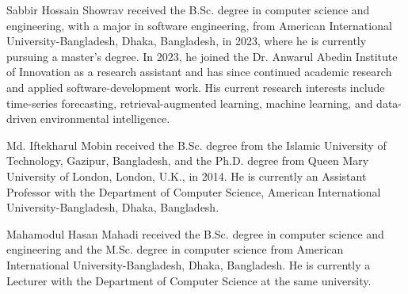 \documentclass{ieeeaccess}
\begin{document}



\begin{IEEEbiographynophoto}{Sabbir Hossain Showrav}
received the B.Sc. degree in computer science and engineering, with a major in
software engineering, from American International University-Bangladesh,
Dhaka, Bangladesh, in 2023, where he is currently pursuing a master's degree.
In 2023, he joined the Dr. Anwarul Abedin Institute of Innovation as a research
assistant and has since continued academic research and applied
software-development work. His current research interests include time-series forecasting,
retrieval-augmented learning, machine learning, and data-driven environmental
intelligence.
\end{IEEEbiographynophoto}

\begin{IEEEbiographynophoto}{Md. Iftekharul Mobin}
received the B.Sc. degree from the Islamic University of Technology, Gazipur,
Bangladesh, and the Ph.D. degree from Queen Mary University of London, London,
U.K., in 2014. He is currently an Assistant Professor with the Department of
Computer Science, American International University-Bangladesh, Dhaka,
Bangladesh.
\end{IEEEbiographynophoto}

\begin{IEEEbiographynophoto}{Mahamodul Hasan Mahadi}
received the B.Sc. degree in computer science and engineering and the M.Sc.
degree in computer science from American International University-Bangladesh,
Dhaka, Bangladesh. He is currently a Lecturer with the Department of Computer
Science at the same university.
\end{IEEEbiographynophoto}

\EOD
\end{document}
